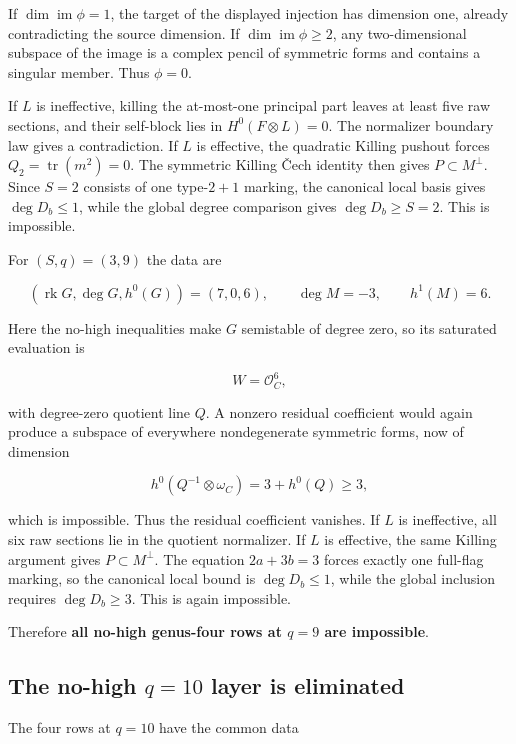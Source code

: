 \documentclass[11pt]{article}
\theoremstyle{definition}
\begin{document}
If \(\dim\operatorname{im}\phi=1\), the target of the displayed
injection has dimension one, already contradicting the source dimension.
If \(\dim\operatorname{im}\phi\ge2\), any two-dimensional subspace of
the image is a complex pencil of symmetric forms and contains a singular
member. Thus \(\phi=0\).

If \(L\) is ineffective, killing the at-most-one principal part leaves
at least five raw sections, and their self-block lies in
\(H^0(F\otimes L)=0\). The normalizer boundary law gives a
contradiction. If \(L\) is effective, the quadratic Killing pushout
forces \(Q_2=\operatorname{tr}(m^2)=0\). The symmetric Killing \v{C}ech
identity then gives \(P\subset M^\perp\). Since \(S=2\) consists of one
type-\(2+1\) marking, the canonical local basis gives \(\deg D_b\le1\),
while the global degree comparison gives \(\deg D_b\ge S=2\). This is
impossible.

For \((S,q)=(3,9)\) the data are

\[(\operatorname{rk}G,\deg G,h^0(G))=(7,0,6),
\qquad \deg M=-3,
\qquad h^1(M)=6.\]

Here the no-high inequalities make \(G\) semistable of degree zero, so
its saturated evaluation is

\[W=\mathcal O_C^6,\]

with degree-zero quotient line \(Q\). A nonzero residual coefficient
would again produce a subspace of everywhere nondegenerate symmetric
forms, now of dimension

\[h^0(Q^{-1}\otimes\omega_C)=3+h^0(Q)\ge3,\]

which is impossible. Thus the residual coefficient vanishes. If \(L\) is
ineffective, all six raw sections lie in the quotient normalizer. If
\(L\) is effective, the same Killing argument gives
\(P\subset M^\perp\). The equation \(2a+3b=3\) forces exactly one
full-flag marking, so the canonical local bound is \(\deg D_b\le1\),
while the global inclusion requires \(\deg D_b\ge3\). This is again
impossible.

Therefore \textbf{all no-high genus-four rows at \(q=9\) are
impossible}.

\subsection{\texorpdfstring{The no-high \(q=10\) layer is
eliminated}{The no-high q=10 layer is eliminated}}\label{the-no-high-q10-layer-is-eliminated}

The four rows at \(q=10\) have the common data
\end{document}
